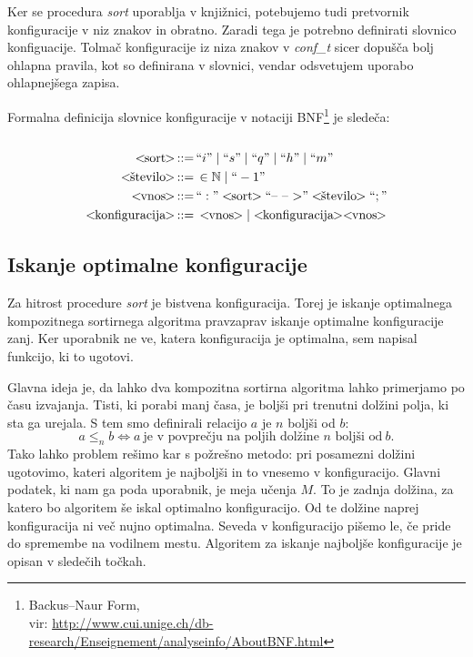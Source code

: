 \documentclass[a4paper,oneside,12pt]{article}
\def\N{\mathbb N}
\def\ali{\;|\;}
\newenvironment{BNF}{
    \\
    \Sbox
    \minipage{12cm}
}{
    \endminipage
    \endSbox
    \minipage{\textwidth}
    \vspace*{5pt}
    \begin{center}
        \fcolorbox{white}{white}{
            \TheSbox
        }
    \end{center}
    \vspace*{5pt}
    \endminipage
}
\def\bnfassign:{\,::=&\,}
\newcommand{\q}[1]{\text{``}#1\text{''}}
\newcommand{\ntm}[1]{\ensuremath{<\!\!\text{#1}\!\!>}}
\newcommand{\abnf}[2]{\ensuremath{\ntm{#1} \bnfassign: #2}}
\begin{document}
Ker se procedura \emph{sort} uporablja v knjižnici, potebujemo tudi pretvornik
konfiguracije v niz znakov in obratno. Zaradi tega je potrebno definirati slovnico
konfiguacije. Tolmač konfiguracije iz niza znakov v \emph{conf\_t} sicer dopušča bolj ohlapna pravila, kot so
definirana v slovnici, vendar odsvetujem uporabo ohlapnejšega zapisa.

Formalna definicija slovnice konfiguracije v notaciji
BNF\footnote{Backus--Naur Form,\\ vir: \url{http://www.cui.unige.ch/db-research/Enseignement/analyseinfo/AboutBNF.html}} 
je sledeča: %
\\
\begin{BNF} %
  \begin{align*}
    \abnf{sort}{\q{i} \ali \q{s} \ali \q{q} \ali \q{h} \ali \q{m}}\\
    \abnf{število}{\in \N \ali \q{-1}} \\
    \abnf{vnos}{\q{:}\ntm{sort}\q{\mbox{--}\ \mbox{--}\ \mbox{$>$}}\ntm{število}\q{;}}\\
    \abnf{konfiguracija}{\ntm{vnos} | \ntm{konfiguracija}\ntm{vnos}}
  \end{align*}
\end{BNF}

\subsection{Iskanje optimalne konfiguracije}
\label{chapter:optimalconf}
Za hitrost procedure \emph{sort} je bistvena konfiguracija.
Torej je iskanje optimalnega kompozitnega sortirnega algoritma pravzaprav iskanje optimalne
konfiguracije zanj. Ker uporabnik ne ve, katera konfiguracija je optimalna, sem napisal
funkcijo, ki to ugotovi. 

Glavna ideja je, da lahko
dva kompozitna sortirna algoritma lahko primerjamo po času izvajanja. Tisti, ki porabi manj
časa, je boljši pri trenutni dolžini polja, ki sta ga urejala.
S tem smo definirali relacijo $a$ je $n$ boljši od $b$:
\[ a \leq_n b \Leftrightarrow a\ \text{je v povprečju na poljih dolžine $n$ boljši
od}\ b.\]
Tako lahko problem rešimo kar s požrešno metodo: 
pri posamezni dolžini ugotovimo, kateri algoritem je najboljši in to vnesemo
v konfiguracijo. Glavni podatek, ki nam ga poda uporabnik, je meja učenja $M$. To je zadnja
dolžina, za katero bo algoritem še iskal optimalno konfiguracijo. Od te dolžine naprej
konfiguracija ni več nujno optimalna. Seveda v konfiguracijo pišemo le, če pride do 
spremembe na vodilnem mestu. Algoritem za iskanje najboljše konfiguracije je opisan v
sledečih točkah.
\end{document}
